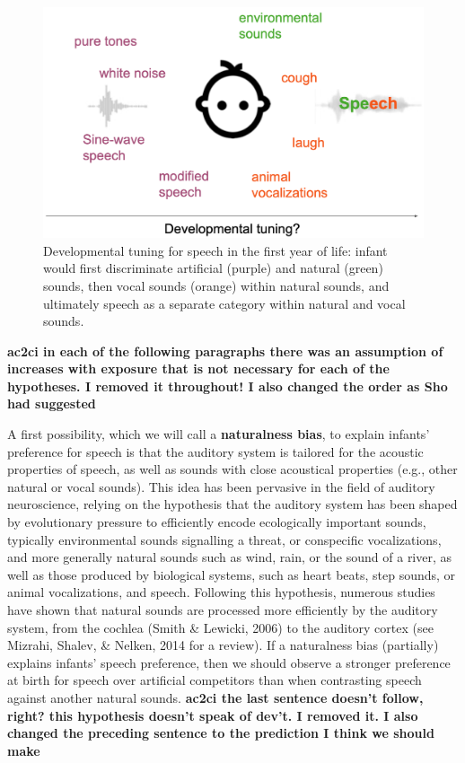 \documentclass[
  english,
  man]{apa6}
\begin{document}
\begin{figure}
\includegraphics[width=5.31in]{figures_intro/tuning} \caption{Developmental tuning for speech in the first year of life: infant would first discriminate artificial (purple) and natural (green) sounds, then vocal sounds (orange) within natural sounds, and ultimately speech as a separate category within natural and vocal sounds.}\label{fig:venn}
\end{figure}

\textbf{ac2ci in each of the following paragraphs there was an assumption of increases with exposure that is not necessary for each of the hypotheses. I removed it throughout! I also changed the order as Sho had suggested}

A first possibility, which we will call a \textbf{naturalness bias}, to explain infants' preference for speech is that the auditory system is tailored for the acoustic properties of speech, as well as sounds with close acoustical properties (e.g., other natural or vocal sounds). This idea has been pervasive in the field of auditory neuroscience, relying on the hypothesis that the auditory system has been shaped by evolutionary pressure to efficiently encode ecologically important sounds, typically environmental sounds signalling a threat, or conspecific vocalizations, and more generally natural sounds such as wind, rain, or the sound of a river, as well as those produced by biological systems, such as heart beats, step sounds, or animal vocalizations, and speech. Following this hypothesis, numerous studies have shown that natural sounds are processed more efficiently by the auditory system, from the cochlea (Smith \& Lewicki, 2006) to the auditory cortex (see Mizrahi, Shalev, \& Nelken, 2014 for a review). If a naturalness bias (partially) explains infants' speech preference, then we should observe a stronger preference at birth for speech over artificial competitors than when contrasting speech against another natural sounds.
\textbf{ac2ci the last sentence doesn't follow, right? this hypothesis doesn't speak of dev't. I removed it. I also changed the preceding sentence to the prediction I think we should make}
\end{document}
